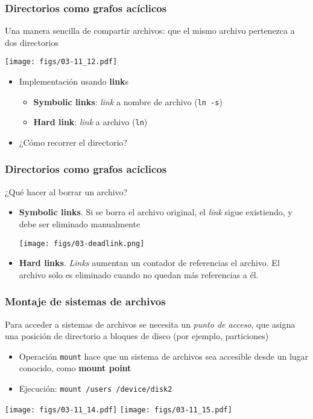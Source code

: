 \documentclass[letter]{beamer}
\begin{document}
\begin{frame}
  \frametitle{Directorios como grafos acíclicos}

  Una manera sencilla de compartir archivos: que el mismo archivo pertenezca a dos directorios
  \begin{center}
    \texttt{[image: figs/03-11\_12.pdf]}
  \end{center}
  \begin{itemize}
    \item Implementación usando {\bf link}s
      \begin{itemize}
        \item {\bf Symbolic links}: {\em link} a nombre de archivo ({\tt ln -s})
        \item {\bf Hard link}: {\em link} a archivo ({\tt ln})
      \end{itemize}
    \item ¿Cómo recorrer el directorio?
  \end{itemize}
  
\end{frame}
\begin{frame}
  \frametitle{Directorios como grafos acíclicos}

  ¿Qué hacer al borrar un archivo?
  \begin{itemize}
    \item {\bf Symbolic links}. Si se borra el archivo original, el {\em link}
          sigue existiendo, y debe ser eliminado manualmente
          \begin{center}
            \texttt{[image: figs/03-deadlink.png]}
          \end{center}
    \item {\bf Hard links}. {\em Links} aumentan un contador de referencias el archivo.
          El archivo solo es eliminado cuando no quedan más referencias a él.
  \end{itemize}

\end{frame}
\begin{frame}
  \frametitle{Montaje de sistemas de archivos}

  Para acceder a sistemas de archivos se necesita un {\em punto de acceso},
  que asigna una posición de directorio a bloques de disco (por ejemplo, particiones)
  \begin{itemize}
    \item Operación {\tt mount} hace que un sistema de archivos sea accesible desde un lugar
          conocido, como {\bf mount point}
    \item Ejecución: {\tt mount /users /device/disk2}
  \end{itemize}

  \begin{center}
    \texttt{[image: figs/03-11\_14.pdf]}
    \texttt{[image: figs/03-11\_15.pdf]}
  \end{center}

\end{frame}
\end{document}
